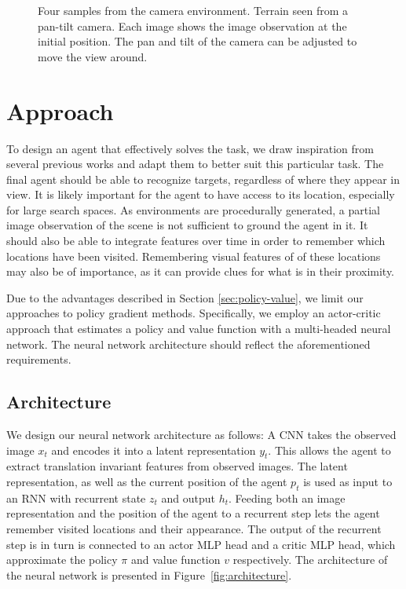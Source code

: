 \begin{figure}
    \centering
    
    \caption[Camera environment]{Four samples from the camera environment. Terrain seen from a pan-tilt camera. Each image shows the image observation at the initial position. The pan and tilt of the camera can be adjusted to move the view around.}
    \label{fig:camera}
\end{figure}

\section{Approach}
\label{sec:approach}

To design an agent that effectively solves the task, we draw inspiration from several previous works and adapt them to better suit this particular task.
The final agent should be able to recognize targets, regardless of where they appear in view.
It is likely important for the agent to have access to its location, especially for large search spaces.
As environments are procedurally generated, a partial image observation of the scene is not sufficient to ground the agent in it.
It should also be able to integrate features over time in order to remember which locations have been visited.
Remembering visual features of of these locations may also be of importance, as it can provide clues for what is in their proximity.

Due to the advantages described in Section \ref{sec:policy-value}, we limit our approaches to policy gradient methods.
Specifically, we employ an actor-critic approach that estimates a policy and value function with a multi-headed neural network.
The neural network architecture should reflect the aforementioned requirements.

\subsection{Architecture}

We design our neural network architecture as follows:
A CNN takes the observed image \(x_t\) and encodes it into a latent representation \(y_t\).
This allows the agent to extract translation invariant features from observed images.
The latent representation, as well as the current position of the agent \(p_t\) is used as input to an RNN with recurrent state \(z_t\) and output \(h_t\).
Feeding both an image representation and the position of the agent to a recurrent step lets the agent remember visited locations and their appearance.
The output of the recurrent step is in turn is connected to an actor MLP head and a critic MLP head, which approximate the policy \(\pi\) and value function \(v\) respectively.
The architecture of the neural network is presented in Figure~\ref{fig:architecture}.

